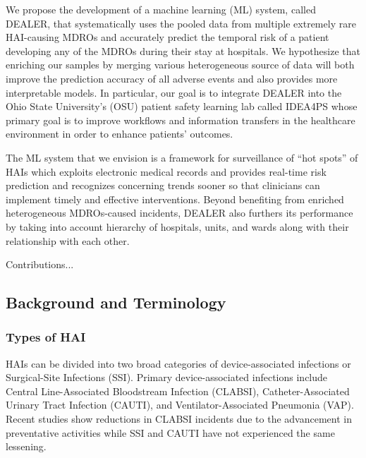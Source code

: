 

We propose the development of a machine learning (ML) system, called DEALER, that systematically uses the pooled data from multiple extremely rare HAI-causing MDROs and accurately predict the temporal risk of a patient developing any of the MDROs during their stay at hospitals. We hypothesize that enriching our samples by merging various heterogeneous source of data will both improve the prediction accuracy of all adverse events and also provides more interpretable models. In particular, our goal is to integrate DEALER into the Ohio State University's (OSU) patient safety learning lab called IDEA4PS whose primary goal is to improve workflows and information transfers in the healthcare environment in order to enhance patients' outcomes.

The ML system that we envision is a framework for surveillance of ``hot spots'' of HAIs which exploits electronic medical records and provides real-time risk prediction and recognizes concerning trends sooner so that clinicians can implement timely and effective interventions. Beyond benefiting from enriched heterogeneous MDROs-caused incidents, DEALER also furthers its performance by taking into account hierarchy of hospitals, units, and wards along with their relationship with each other.


Contributions...







\subsection{Background and Terminology}
\subsubsection{Types of HAI}
HAIs can be divided into two broad categories of device-associated infections or Surgical-Site Infections (SSI). Primary device-associated infections include Central Line-Associated Bloodstream Infection (CLABSI), Catheter-Associated Urinary Tract Infection (CAUTI), and Ventilator-Associated Pneumonia (VAP). Recent studies show reductions in CLABSI incidents due to the advancement in preventative activities while SSI and CAUTI have not experienced the same lessening.

